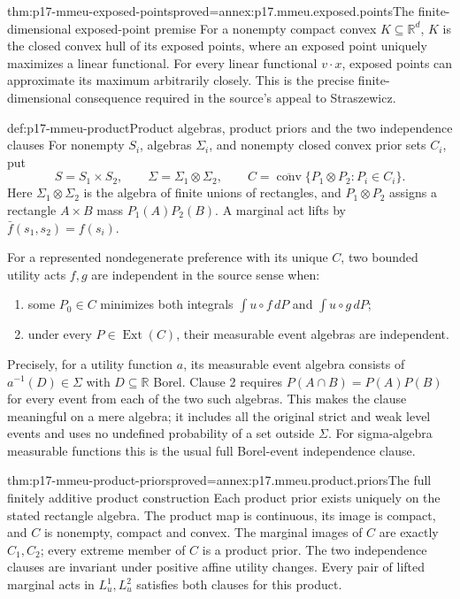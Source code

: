 \begin{hbtheorem}{thm:p17-mmeu-exposed-points}{proved=annex:p17.mmeu.exposed.points}{The finite-dimensional exposed-point premise}
For a nonempty compact convex \(K\subseteq\mathbb R^d\),
\(K\) is the closed convex hull of its exposed points,
where an exposed point uniquely maximizes a linear functional.
For every linear functional \(v\cdot x\), exposed points
can approximate its maximum arbitrarily closely.
This is the precise finite-dimensional consequence required
in the source's appeal to Straszewicz.
\end{hbtheorem}

\begin{hbdefinition}{def:p17-mmeu-product}{Product algebras, product priors and the two independence clauses}
For nonempty \(S_i\), algebras \(\Sigma_i\), and nonempty
closed convex prior sets \(C_i\), put
\[
 S=S_1\times S_2,\qquad
 \Sigma=\Sigma_1\otimes\Sigma_2,
 \qquad
 C=\overline{\operatorname{conv}}\{P_1\otimes P_2:P_i\in C_i\}.
\]
Here \(\Sigma_1\otimes\Sigma_2\) is the algebra of finite
unions of rectangles, and \(P_1\otimes P_2\) assigns a
rectangle \(A\times B\) mass \(P_1(A)P_2(B)\).
A marginal act lifts by \(\bar f(s_1,s_2)=f(s_i)\).

For a represented nondegenerate preference with its unique
\(C\), two bounded utility acts \(f,g\) are independent in
the source sense when:
\begin{enumerate}
\item some \(P_0\in C\) minimizes both integrals
\(\int u\circ f\,dP\) and \(\int u\circ g\,dP\);
\item under every \(P\in\operatorname{Ext}(C)\), their
measurable event algebras are independent.
\end{enumerate}
Precisely, for a utility function \(a\), its measurable
event algebra consists of \(a^{-1}(D)\in\Sigma\) with
\(D\subseteq\mathbb R\) Borel. Clause 2 requires
\(P(A\cap B)=P(A)P(B)\) for every event from each of the
two such algebras. This makes the clause meaningful on
a mere algebra; it includes all the original strict and
weak level events and uses no undefined probability of
a set outside \(\Sigma\).
For sigma-algebra measurable functions this is the usual
full Borel-event independence clause.
\end{hbdefinition}

\begin{hbtheorem}{thm:p17-mmeu-product-priors}{proved=annex:p17.mmeu.product.priors}{The full finitely additive product construction}
Each product prior exists uniquely on the stated rectangle
algebra. The product map is continuous, its image is compact,
and \(C\) is nonempty, compact and convex.
The marginal images of \(C\) are exactly \(C_1,C_2\);
every extreme member of \(C\) is a product prior.
The two independence clauses are invariant under positive
affine utility changes. Every pair of lifted marginal acts
in \(L_u^1,L_u^2\) satisfies both clauses for this product.
\end{hbtheorem}

